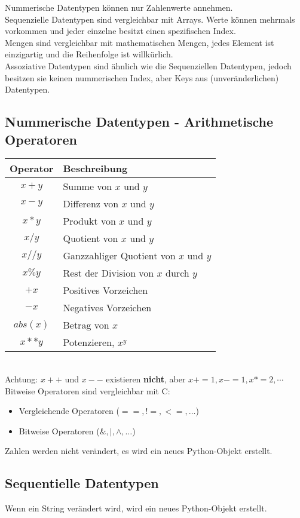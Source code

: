 Nummerische Datentypen können \glqq{}nur\grqq{} Zahlenwerte annehmen.\\
Sequenzielle Datentypen sind vergleichbar mit Arrays. Werte können mehrmals vorkommen
und jeder einzelne besitzt einen spezifischen Index.\\
Mengen sind vergleichbar mit mathematischen Mengen, jedes Element ist einzigartig
und die Reihenfolge ist willkürlich.\\
Assoziative Datentypen sind ähnlich wie die Sequenziellen Datentypen, jedoch besitzen sie 
keinen nummerischen Index, aber Keys aus (unveränderlichen) Datentypen.

\subsection{Nummerische Datentypen - Arithmetische Operatoren}
	\begin{tabular}{ cl }
	\hline
	\textbf{Operator} & \textbf{Beschreibung}\\
	\hline
	$x+y$& Summe von $x$ und $y$\\
	$x-y$& Differenz von $x$ und $y$\\
	$x*y$& Produkt von $x$ und $y$\\
	$x/y$& Quotient von $x$ und $y$\\
	$x//y$& Ganzzahliger Quotient von $x$ und $y$\\
	$x\%y$& Rest der Division von $x$ durch $y$\\
	$+x$& Positives Vorzeichen\\
	$-x$& Negatives Vorzeichen\\
	$abs(x)$& Betrag von $x$\\
	$x**y$& Potenzieren, $x^y$\\
	\hline
	\end{tabular}
	\\
	{\color{red}Achtung:} $x++$ und $x--$ existieren \textbf{nicht}, aber $x+=1, x-=1, x*=2, \cdots$\\
	Bitweise Operatoren sind vergleichbar mit C:
	\begin{itemize}
	\item Vergleichende Operatoren ($==, !=, <=, \dots$)
	\item Bitweise Operatoren ($\&, |, \land, \dots$)
	\end{itemize}
	
	Zahlen werden nicht verändert, es wird ein neues Python-Objekt erstellt.
	
\subsection{Sequentielle Datentypen}
	
	Wenn ein String verändert wird, wird ein neues Python-Objekt erstellt.
	
